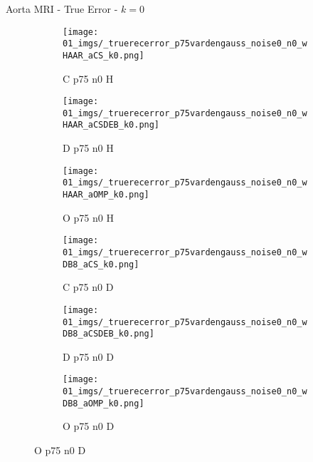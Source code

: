 \begin{frame}{Aorta MRI - True Error - $k=0$}{}
\begin{figure}
\begin{subfigure}{0.13\textwidth}
\texttt{[image: 01\_imgs/\_truerecerror\_p75vardengauss\_noise0\_n0\_wHAAR\_aCS\_k0.png]}
\caption*{\tiny C p75 n0 H}
\end{subfigure}
\begin{subfigure}{0.13\textwidth}
\texttt{[image: 01\_imgs/\_truerecerror\_p75vardengauss\_noise0\_n0\_wHAAR\_aCSDEB\_k0.png]}
\caption*{\tiny D p75 n0 H}
\end{subfigure}
\begin{subfigure}{0.13\textwidth}
\texttt{[image: 01\_imgs/\_truerecerror\_p75vardengauss\_noise0\_n0\_wHAAR\_aOMP\_k0.png]}
\caption*{\tiny O p75 n0 H}
\end{subfigure}
\begin{subfigure}{0.13\textwidth}
\texttt{[image: 01\_imgs/\_truerecerror\_p75vardengauss\_noise0\_n0\_wDB8\_aCS\_k0.png]}
\caption*{\tiny C p75 n0 D}
\end{subfigure}
\begin{subfigure}{0.13\textwidth}
\texttt{[image: 01\_imgs/\_truerecerror\_p75vardengauss\_noise0\_n0\_wDB8\_aCSDEB\_k0.png]}
\caption*{\tiny D p75 n0 D}
\end{subfigure}
\begin{subfigure}{0.13\textwidth}
\texttt{[image: 01\_imgs/\_truerecerror\_p75vardengauss\_noise0\_n0\_wDB8\_aOMP\_k0.png]}
\caption*{\tiny O p75 n0 D}
\end{subfigure}
\end{figure}
\end{frame}


